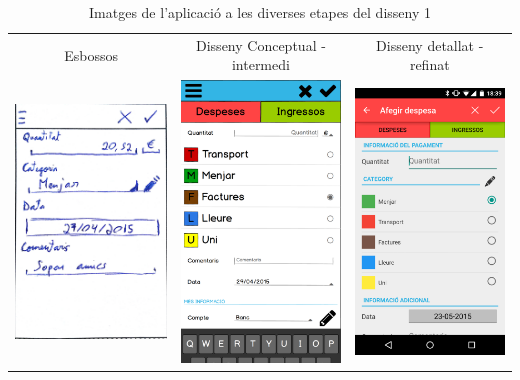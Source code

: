 \begin{table}
\begin{tabular}{| c | c | c |}
\hline
Esbossos & Disseny Conceptual - intermedi & Disseny detallat - refinat \\
\includegraphics[width=50mm]{1_Add_expense.jpg} &
\includegraphics[width=50mm]{2_Add_expense.png} &
\includegraphics[width=50mm]{3_Add_expense.png} \\
\hline
\end{tabular}
\caption{Imatges de l'aplicació a les diverses etapes del disseny 1}
\label{table:images_app1}
\end{table}

